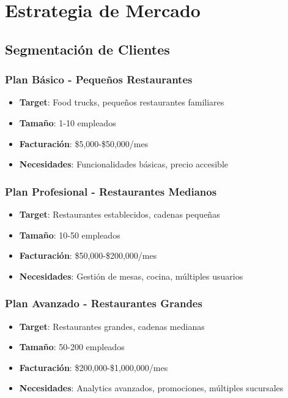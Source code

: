 \documentclass[12pt,a4paper]{article}
\begin{document}
\section{Estrategia de Mercado}

\subsection{Segmentación de Clientes}

\subsubsection{Plan Básico - Pequeños Restaurantes}

\begin{itemize}
    \item \textbf{Target}: Food trucks, pequeños restaurantes familiares
    \item \textbf{Tamaño}: 1-10 empleados
    \item \textbf{Facturación}: \$5,000-\$50,000/mes
    \item \textbf{Necesidades}: Funcionalidades básicas, precio accesible
\end{itemize}

\subsubsection{Plan Profesional - Restaurantes Medianos}

\begin{itemize}
    \item \textbf{Target}: Restaurantes establecidos, cadenas pequeñas
    \item \textbf{Tamaño}: 10-50 empleados
    \item \textbf{Facturación}: \$50,000-\$200,000/mes
    \item \textbf{Necesidades}: Gestión de mesas, cocina, múltiples usuarios
\end{itemize}

\subsubsection{Plan Avanzado - Restaurantes Grandes}

\begin{itemize}
    \item \textbf{Target}: Restaurantes grandes, cadenas medianas
    \item \textbf{Tamaño}: 50-200 empleados
    \item \textbf{Facturación}: \$200,000-\$1,000,000/mes
    \item \textbf{Necesidades}: Analytics avanzados, promociones, múltiples sucursales
\end{itemize}
\end{document}
